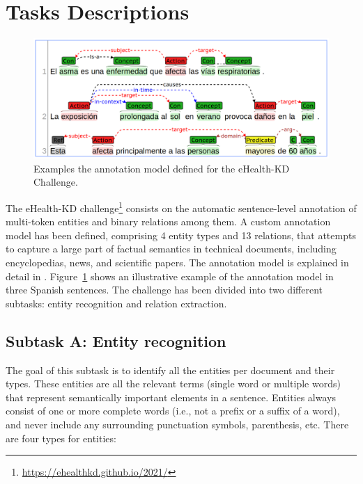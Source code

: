 \documentclass[a4paper,11pt,twocolumn,twoside]{article}
\begin{document}
\section{Tasks Descriptions}\label{sec:task}

\begin{figure}[htb]
  \includegraphics[width=\textwidth]{model.png}
  \caption{Examples the annotation model defined for the eHealth-KD Challenge.\label{fig:model}}
\end{figure}

The eHealth-KD challenge\footnote{\url{https://ehealthkd.github.io/2021/}} consists on the automatic sentence-level annotation
of multi-token entities and binary relations among them.
A custom annotation model has been defined, comprising 4 entity types and 13 relations,
that attempts to capture a large part of factual semantics in technical documents,
including encyclopedias, news, and scientific papers. The annotation model is explained in detail in . Figure~\ref{fig:model} shows an illustrative example of the annotation model in three Spanish sentences.
The challenge has been divided into two different subtasks: entity recognition and relation extraction.

\subsection{Subtask A: Entity recognition}

The goal of this subtask is to identify all the entities per document and their types. These entities are all the relevant terms (single word or multiple words) that represent semantically important elements in a sentence. Entities always consist of one or more complete words (i.e., not a prefix or a suffix of a word), and never include any surrounding punctuation symbols, parenthesis, etc. There are four types for entities:
\end{document}
